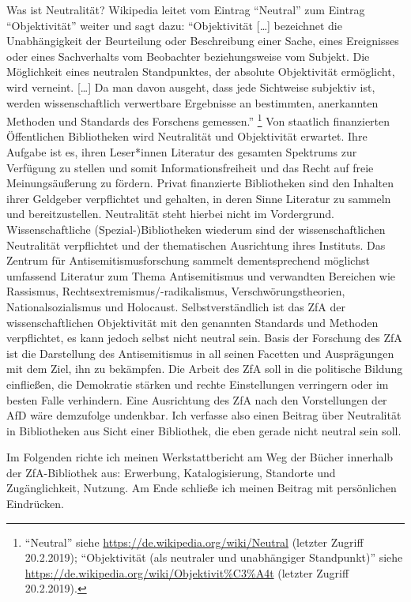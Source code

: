\documentclass[a4paper,
fontsize=11pt,
oneside,
numbers=noperiodatend,
parskip=half-,
bibliography=totoc,
final
]{scrartcl}
\begin{document}
Was ist Neutralität? Wikipedia leitet vom Eintrag \enquote{Neutral} zum
Eintrag \enquote{Objektivität} weiter und sagt dazu:
\enquote{Objektivität {[}\ldots{}{]} bezeichnet die Unabhängigkeit der
Beurteilung oder Beschreibung einer Sache, eines Ereignisses oder eines
Sachverhalts vom Beobachter beziehungsweise vom Subjekt. Die Möglichkeit
eines neutralen Standpunktes, der absolute Objektivität ermöglicht, wird
verneint. {[}\ldots{}{]} Da man davon ausgeht, dass jede Sichtweise
subjektiv ist, werden wissenschaftlich verwertbare Ergebnisse an
bestimmten, anerkannten Methoden und Standards des Forschens gemessen.}
\footnote{\enquote{Neutral} siehe
  \url{https://de.wikipedia.org/wiki/Neutral} (letzter Zugriff
  20.2.2019); \enquote{Objektivität (als neutraler und unabhängiger
  Standpunkt)} siehe
  \url{https://de.wikipedia.org/wiki/Objektivit\%C3\%A4t} (letzter
  Zugriff 20.2.2019).} Von staatlich finanzierten Öffentlichen
Bibliotheken wird Neutralität und Objektivität erwartet. Ihre Aufgabe
ist es, ihren Leser*innen Literatur des gesamten Spektrums zur Verfügung
zu stellen und somit Informationsfreiheit und das Recht auf freie
Meinungsäußerung zu fördern. Privat finanzierte Bibliotheken sind den
Inhalten ihrer Geldgeber verpflichtet und gehalten, in deren Sinne
Literatur zu sammeln und bereitzustellen. Neutralität steht hierbei
nicht im Vordergrund. Wissenschaftliche (Spezial-)Bibliotheken wiederum
sind der wissenschaftlichen Neutralität verpflichtet und der
thematischen Ausrichtung ihres Instituts. Das Zentrum für
Antisemitismusforschung sammelt dementsprechend möglichst umfassend
Literatur zum Thema Antisemitismus und verwandten Bereichen wie
Rassismus, Rechtsextremismus/-radikalismus, Verschwörungstheorien,
Nationalsozialismus und Holocaust. Selbstverständlich ist das ZfA der
wissenschaftlichen Objektivität mit den genannten Standards und Methoden
verpflichtet, es kann jedoch selbst nicht neutral sein. Basis der
Forschung des ZfA ist die Darstellung des Antisemitismus in all seinen
Facetten und Ausprägungen mit dem Ziel, ihn zu bekämpfen. Die Arbeit des
ZfA soll in die politische Bildung einfließen, die Demokratie stärken
und rechte Einstellungen verringern oder im besten Falle verhindern.
Eine Ausrichtung des ZfA nach den Vorstellungen der AfD wäre demzufolge
undenkbar. Ich verfasse also einen Beitrag über Neutralität in
Bibliotheken aus Sicht einer Bibliothek, die eben gerade nicht neutral
sein soll.

Im Folgenden richte ich meinen Werkstattbericht am Weg der Bücher
innerhalb der ZfA-Bibliothek aus: Erwerbung, Katalogisierung, Standorte
und Zugänglichkeit, Nutzung. Am Ende schließe ich meinen Beitrag mit
persönlichen Eindrücken.
\end{document}
